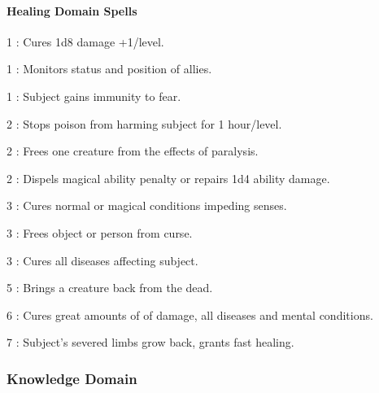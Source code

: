 \paragraph{Healing Domain Spells}
\begin{list}{}{\leftmargin=1em}
\item[1] : Cures 1d8 damage +1/level.
\item[1] : Monitors status and position of allies.
\item[1] : Subject gains immunity to fear.
\item[2] : Stops poison from harming subject for 1 hour/level.
\item[2] : Frees one creature from the effects of paralysis.
\item[2] : Dispels magical ability penalty or repairs 1d4 ability damage.
\item[3] : Cures normal or magical conditions impeding senses.
\item[3] : Frees object or person from curse.
\item[3] : Cures all diseases affecting subject.
\item[5] : Brings a creature back from the dead.
\item[6] : Cures great amounts of of damage, all diseases and mental conditions.
\item[7] : Subject's severed limbs grow back, grants fast healing.
\end{list}
\subsubsection{Knowledge Domain}
\label{Domain:Knowledge}
